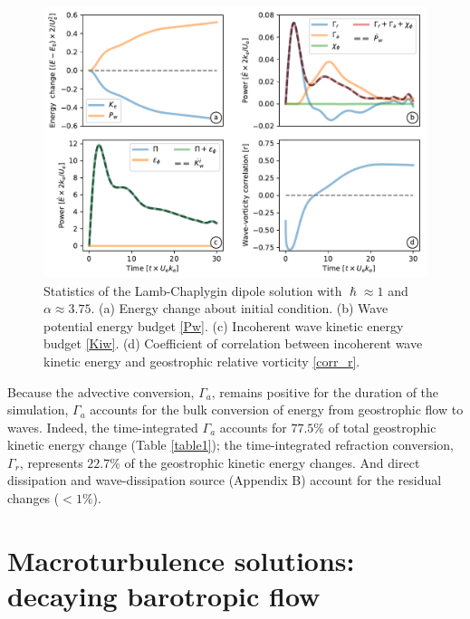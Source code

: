 \documentclass{jfm}
\begin{document}
\begin{figure}
\label{stats_lamb}
\centering
\includegraphics[width=1.\textwidth]{figs/fig2.pdf}
\caption{Statistics of the Lamb-Chaplygin dipole solution with $\hslash \approx 1$
        and $\alpha \approx 3.75$. (a) Energy change about initial condition.
        (b) Wave potential energy budget \eqref{Pw}. (c) Incoherent wave kinetic
        energy budget \eqref{Kiw}. (d) Coefficient of correlation between
        incoherent wave
        kinetic energy and geostrophic relative vorticity \eqref{corr_r}.
        }
\end{figure}

Because the advective conversion, $\Gamma_a$, remains positive for the duration
of the simulation, $\Gamma_a$ accounts for the bulk conversion of energy from
geostrophic flow to waves. Indeed, the time-integrated $\Gamma_a$ accounts for $77.5\%$
of total geostrophic kinetic energy change (Table \ref{table1}); the time-integrated
refraction conversion, $\Gamma_r$, represents $22.7\%$ of the geostrophic kinetic
energy changes. And direct dissipation and wave-dissipation source
(Appendix B) account for the residual changes ($<1\%$).



\section{Macroturbulence solutions: decaying barotropic flow}\label{turbulence}
\end{document}
